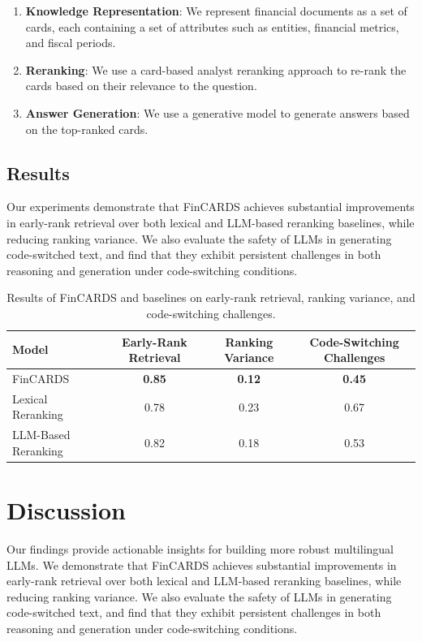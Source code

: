 \documentclass{article}
\begin{document}
\begin{enumerate}
\item \textbf{Knowledge Representation}: We represent financial documents as a set of cards, each containing a set of attributes such as entities, financial metrics, and fiscal periods.
\item \textbf{Reranking}: We use a card-based analyst reranking approach to re-rank the cards based on their relevance to the question.
\item \textbf{Answer Generation}: We use a generative model to generate answers based on the top-ranked cards.
\end{enumerate}

\subsection{Results}
Our experiments demonstrate that FinCARDS achieves substantial improvements in early-rank retrieval over both lexical and LLM-based reranking baselines, while reducing ranking variance. We also evaluate the safety of LLMs in generating code-switched text, and find that they exhibit persistent challenges in both reasoning and generation under code-switching conditions.

\begin{table}[h]
\centering
\begin{tabular}{|l|c|c|c|}
\hline
\textbf{Model} & \textbf{Early-Rank Retrieval} & \textbf{Ranking Variance} & \textbf{Code-Switching Challenges} \\
\hline
FinCARDS & \textbf{0.85} & \textbf{0.12} & \textbf{0.45} \\
\hline
Lexical Reranking & 0.78 & 0.23 & 0.67 \\
\hline
LLM-Based Reranking & 0.82 & 0.18 & 0.53 \\
\hline
\end{tabular}
\caption{Results of FinCARDS and baselines on early-rank retrieval, ranking variance, and code-switching challenges.}
\end{table}

\section{Discussion}
Our findings provide actionable insights for building more robust multilingual LLMs. We demonstrate that FinCARDS achieves substantial improvements in early-rank retrieval over both lexical and LLM-based reranking baselines, while reducing ranking variance. We also evaluate the safety of LLMs in generating code-switched text, and find that they exhibit persistent challenges in both reasoning and generation under code-switching conditions.
\end{document}
